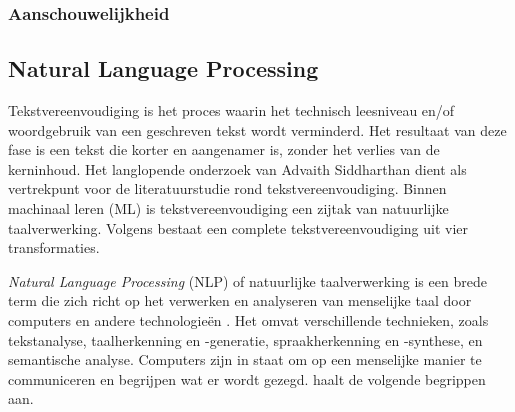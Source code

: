 
\subsubsection{Aanschouwelijkheid}


\subsection{Natural Language Processing}


Tekstvereenvoudiging is het proces waarin het technisch leesniveau en/of woordgebruik van een geschreven tekst wordt verminderd. Het resultaat van deze fase is een tekst die korter en aangenamer is, zonder het verlies van de kerninhoud. Het langlopende onderzoek van Advaith Siddharthan dient als vertrekpunt voor de literatuurstudie rond tekstvereenvoudiging. Binnen machinaal leren (ML) is tekstvereenvoudiging een zijtak van natuurlijke taalverwerking. Volgens \autocite{Siddharthan2014} bestaat een complete tekstvereenvoudiging uit vier transformaties. %

\textit{Natural Language Processing} (NLP) of natuurlijke taalverwerking is een brede term die zich richt op het verwerken en analyseren van menselijke taal door computers en andere technologieën \autocite{Eisenstein2019}. Het omvat verschillende technieken, zoals tekstanalyse, taalherkenning en -generatie, spraakherkenning en -synthese, en semantische analyse. Computers zijn in staat om op een menselijke manier te communiceren en begrijpen wat er wordt gezegd. \textcite{Sohom2019} haalt de volgende begrippen aan.

